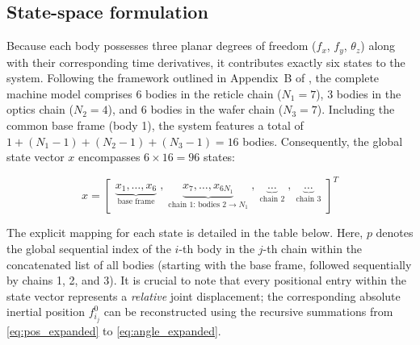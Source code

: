 \documentclass[11pt]{article}
\theoremstyle{definition}
\begin{document}
\subsection{State-space formulation}

Because each body possesses three planar degrees of freedom ($f_x$, $f_y$, $\theta_z$) along with their corresponding time derivatives, it contributes exactly six states to the system. Following the framework outlined in Appendix~B of \cite{Al-Rawashdeh2022_Caracterization}, the complete machine model comprises 6 bodies in the reticle chain ($N_1 = 7$), 3 bodies in the optics chain ($N_2 = 4$), and 6 bodies in the wafer chain ($N_3 = 7$). Including the common base frame (body 1), the system features a total of $1 + (N_1-1) + (N_2-1) + (N_3-1) = 16$ bodies. Consequently, the global state vector $x$ encompasses $6 \times 16 = 96$ states:

\begin{equation}
    x =
    \begin{bmatrix}
        \underbrace{x_1, \ldots, x_6}_{\text{base frame}} \;,\;
        \underbrace{x_7, \ldots, x_{6N_1}}_{\text{chain 1: bodies } 2 \to N_1} \;,\;
        \underbrace{\ldots}_{\text{chain 2}} \;,\;
        \underbrace{\ldots}_{\text{chain 3}}
    \end{bmatrix}^T
\end{equation}

The explicit mapping for each state is detailed in the table below. Here, $p$ denotes the global sequential index of the $i$-th body in the $j$-th chain within the concatenated list of all bodies (starting with the base frame, followed sequentially by chains 1, 2, and 3). It is crucial to note that every positional entry within the state vector represents a \emph{relative} joint displacement; the corresponding absolute inertial position $f^0_{i_j}$ can be reconstructed using the recursive summations from \eqref{eq:pos_expanded} to \eqref{eq:angle_expanded}.
\end{document}
